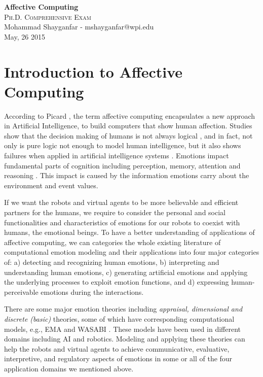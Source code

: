 \documentclass[11pt]{article}
\begin{document}

\begin{center}
{\LARGE{\textbf{Affective Computing}}} \\
\Large\textsc{Ph.D. Comprehensive Exam} \\[1em]
\large\textnormal{Mohammad Shayganfar - mshayganfar@wpi.edu} \\
\large\textnormal{May, 26 2015}
\end{center}

\section{Introduction to Affective Computing}
According to Picard \cite{picard:affective-computing}, the term affective
computing encapsulates a new approach in Artificial Intelligence, to build
computers that show human affection. Studies show that the decision making of
humans is not always logical \cite{GrossbergGutowski:affect-cognition}, and in
fact, not only is pure logic not enough to model human intelligence, but it also
shows failures when applied in artificial intelligence systems
\cite{dreyfus:artificial-critique}. Emotions impact fundamental parts of
cognition including perception, memory, attention and reasoning
\cite{clore:judgement-regulation}. This impact is caused by the information
emotions carry about the environment and event values.

If we want the robots and virtual agents to be more believable and efficient
partners for the humans, we require to consider the personal and social
functionalities and characteristics of emotions for our robots to coexist with
humans, the emotional beings. To have a better understanding of applications
of affective computing, we can categories the whole existing literature of
computational emotion modeling and their applications into four major categories
of: a) detecting and recognizing human emotions, b) interpreting and
understanding human emotions, c) generating artificial emotions and applying the
underlying processes to exploit emotion functions, and d) expressing
human-perceivable emotions during the interactions.

There are some major emotion theories including \textit{appraisal, dimensional
and discrete (basic)} theories, some of which have corresponding computational
models, e.g., EMA \cite{marsella:ema-process-model} and WASABI
\cite{becker:wasabi,becker:wasabi-description}. These models have been used in
different domains including AI and robotics. Modeling and applying these
theories can help the robots and virtual agents to achieve communicative,
evaluative, interpretive, and regulatory aspects of emotions in some or all of
the four application domains we mentioned above.
\end{document}
